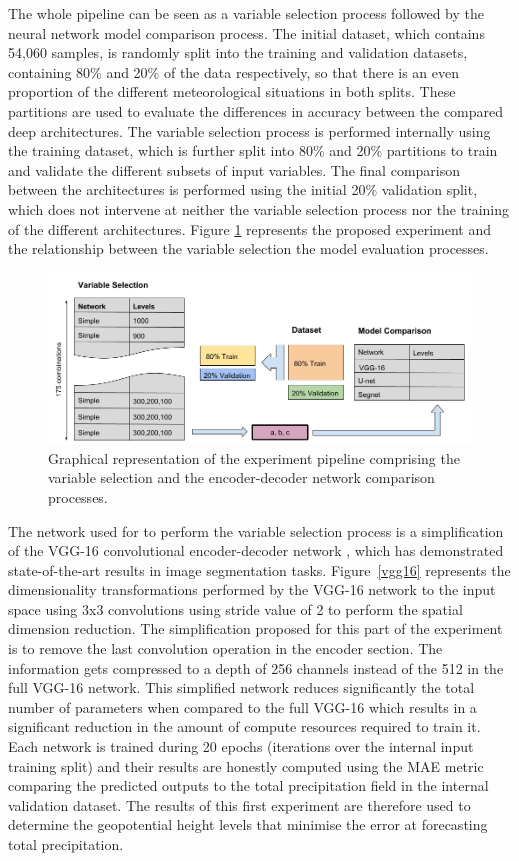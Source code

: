 \documentclass[twocol]{ametsoc}
\begin{document}
The whole pipeline can be seen as a variable selection process followed by the neural network model comparison process. The initial dataset, which contains 54,060 samples, is randomly split into the training and validation datasets, containing 80\% and 20\% of the data respectively, so that there is an even proportion of the different meteorological situations in both splits. These partitions are used to evaluate the differences in accuracy between the compared deep architectures. The variable selection process is performed internally using the training dataset, which is further split into 80\% and 20\% partitions to train and validate the different subsets of input variables. The final comparison between the architectures is performed using the initial 20\% validation split, which does not intervene at neither the variable selection process nor the training of the different architectures. Figure \ref{exp} represents the proposed experiment and the relationship between the variable selection the model evaluation processes. 

\begin{figure}[h]
 \centerline{\includegraphics[width=13cm]{experiment.png}}
  \caption{Graphical representation of the experiment pipeline comprising the variable selection and the encoder-decoder network comparison processes.}\label{exp}
\end{figure}

The network used for to perform the variable selection process is a simplification of the VGG-16 convolutional encoder-decoder network \citep{long2015fully}, which has demonstrated state-of-the-art results in image segmentation tasks. Figure~\ref{vgg16} represents the dimensionality transformations performed by the VGG-16 network to the input space using 3x3 convolutions using stride value of 2 to perform the spatial dimension reduction. The simplification proposed for this part of the experiment is to remove the last convolution operation in the encoder section. The information gets compressed to a depth of 256 channels instead of the 512 in the full VGG-16 network. This simplified network reduces significantly the total number of parameters when compared to the full VGG-16 which results in a significant reduction in the amount of compute resources required to train it. Each network is trained during 20 epochs (iterations over the internal input training split) and their results are honestly computed using the MAE metric comparing the predicted outputs to the total precipitation field in the internal validation dataset. The results of this first experiment are therefore used to determine the geopotential height levels that minimise the error at forecasting total precipitation. 
\end{document}
